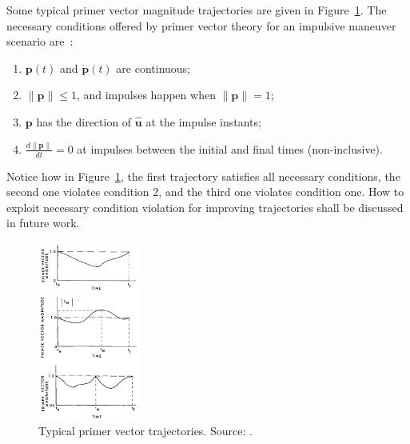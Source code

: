 Some typical primer vector magnitude trajectories are given in Figure~\ref{fig:primer_trajectory_example}. The necessary conditions offered by primer vector theory for an impulsive maneuver scenario are~\cite{Conway_2010}:
\begin{enumerate}
    \item \(\mathbf{p}(t)\) and \(\dot{\mathbf{p}}(t)\) are continuous;
    \item \(\lVert \mathbf{p} \rVert \leq 1\), and impulses happen when \(\lVert \mathbf{p} \rVert = 1\);
    \item \(\mathbf{p}\) has the direction of \(\hat{\mathbf{u}}\) at the impulse instants;
    \item \(\frac{d \lVert \mathbf{p} \rVert}{dt} = 0\) at impulses between the initial and final times (non-inclusive).
\end{enumerate}

Notice how in Figure~\ref{fig:primer_trajectory_example}, the first trajectory satisfies all necessary conditions, the second one violates condition 2, and the third one violates condition one. How to exploit necessary condition violation for improving trajectories shall be discussed in future work.

\begin{figure}[htbp]
    \centering
    \includegraphics[width=0.3\textwidth]{img/primer_vector_history_from_jezewsky.png}
    \caption{Typical primer vector trajectories. Source: \cite{efficient_n_impulse}.}
    \label{fig:primer_trajectory_example}
\end{figure}